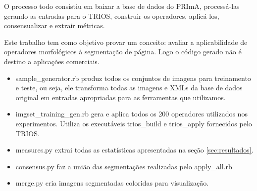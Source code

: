 \documentclass[a4paper,11pt]{article}
\begin{document}
    O processo todo consistiu em baixar a base de dados do PRImA, processá-las gerando as entradas para o TRIOS, construir os operadores, aplicá-los, consensualizar e extrair métricas.

    Este trabalho tem como objetivo provar um conceito: avaliar a aplicabilidade de operadores morfológicos à segmentação de página. Logo o código gerado não é destino a aplicações comerciais.

    \begin{itemize}
      \item sample\_generator.rb produz todos os conjuntos de imagens para treinamento e teste, ou seja, ele transforma todas as imagens e XMLs da base de dados original em entradas apropriadas para as ferramentas que utilizamos.
      \item imgset\_training\_gen.rb gera e aplica todos os 200 operadores utilizados nos experimentos. Utiliza os executáveis trios\_build e trios\_apply fornecidos pelo TRIOS.
      \item measures.py extrai todas as estatísticas apresentadas na seção \ref{sec:resultados}.
      \item consensus.py faz a união das segmentações realizadas pelo apply\_all.rb
      \item merge.py cria imagens segmentadas coloridas para visualização.
    \end{itemize}


%
{\small 
}
\end{document}
